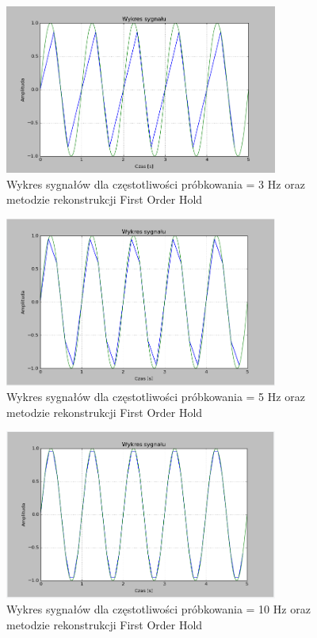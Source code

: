 \documentclass{article}
\begin{document}
    \begin{figure}[h!]
        \centering
        \includegraphics[width=0.8\textwidth]{img/1/foh3.png}
        \caption{Wykres sygnałów dla częstotliwości próbkowania = 3 Hz oraz metodzie rekonstrukcji First Order Hold}
    \end{figure}
    \FloatBarrier

    \begin{figure}[h!]
        \centering
        \includegraphics[width=0.8\textwidth]{img/1/foh5.png}
        \caption{Wykres sygnałów dla częstotliwości próbkowania = 5 Hz oraz metodzie rekonstrukcji First Order Hold}
    \end{figure}
    \FloatBarrier

    \begin{figure}[h!]
        \centering
        \includegraphics[width=0.8\textwidth]{img/1/foh10.png}
        \caption{Wykres sygnałów dla częstotliwości próbkowania = 10 Hz oraz metodzie rekonstrukcji First Order Hold}
    \end{figure}
    \FloatBarrier
\end{document}

